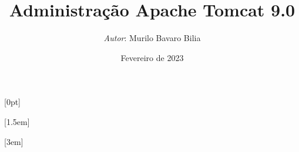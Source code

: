 \cftsetpnumwidth{1cm} %
\usepackage{tabularx} %

\usepackage{accsupp}
\newcommand{\CopyAndPaste}{%
	\def\lst@OutputSpace{\lst@ttfamily\char32\protect\BeginAccSupp{method=hex,unicode,ActualText=20}\lst@ActualOutputSpace\protect\EndAccSupp{}\lst@ttfamily\char32}%
	\let\lst@OutputTab=\lst@OutputSpace
	\let\lst@OutputCR=\lst@OutputSpace
	\let\lst@OutputFF=\lst@OutputSpace
}


\title{\ubuntu Administração Apache Tomcat 9.0} %
\author{\emph{Autor}: Murilo Bavaro Bilia} %
\date{Fevereiro de 2023} %

\usepackage{titletoc}

[0pt]
{\addvspace{1em}}
{\bfseries\chaptername\ \thecontentslabel\quad}
{}
{\hfill\contentspage}

[1.5em]
{\addvspace{0.5em}}
{\contentslabel{1.5em}\hspace{0.5em}}
{\hspace{0.5em}}
{\contentspage}

[3em]
{\addvspace{0.25em}}
{\contentslabel{2.25em}\hspace{0.75em}}
{\hspace{0.75em}}
{\contentspage}
